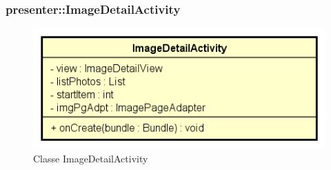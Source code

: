 \documentclass[../DefinizioneDiProdotto.tex]{subfiles}
\begin{document}
\subsubsection{presenter::ImageDetailActivity}

    \begin{figure}[H]
        \centering
        \includegraphics{img/ImageDetailActivity.png}
        \caption{Classe ImageDetailActivity}\label{fig:presenter::ImageDetailActivity} 
    \end{figure}
\end{document}

